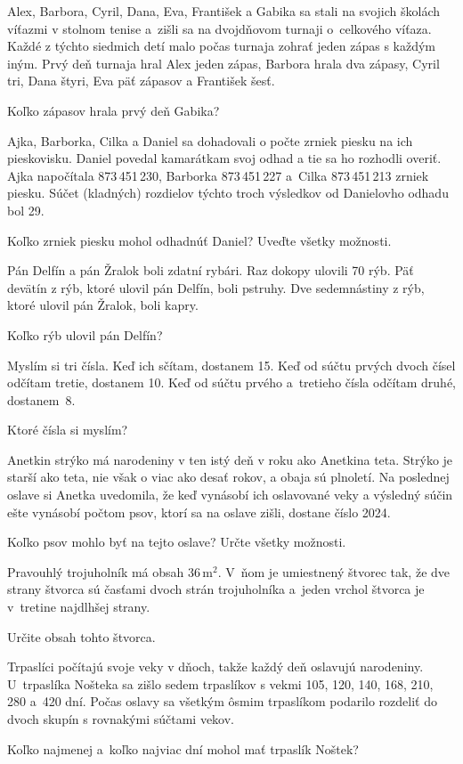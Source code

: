 {%
Alex, Barbora, Cyril, Dana, Eva, František a Gabika sa stali na svojich školách víťazmi v stolnom tenise
a~zišli sa na dvojdňovom turnaji o~celkového víťaza.
Každé z týchto siedmich detí malo počas turnaja zohrať jeden zápas s každým iným.
Prvý deň turnaja hral Alex jeden zápas, Barbora hrala dva zápasy, Cyril tri, Dana štyri, Eva päť zápasov a František šesť.

Koľko zápasov hrala prvý deň Gabika?
}

{%
Ajka, Barborka, Cilka a Daniel sa dohadovali o počte zrniek piesku na ich pieskovisku.
Daniel povedal kamarátkam svoj odhad a tie sa ho rozhodli overiť.
Ajka napočítala 873\,451\,230, Barborka 873\,451\,227 a~Cilka 873\,451\,213 zrniek piesku.
Súčet (kladných) rozdielov týchto troch výsledkov od Danielovho odhadu bol 29.

Koľko zrniek piesku mohol odhadnúť Daniel?
Uveďte všetky možnosti.
}

{%


Pán Delfín a pán Žralok boli zdatní rybári.
Raz dokopy ulovili 70 rýb.
Päť devätín z rýb, ktoré ulovil pán Delfín, boli pstruhy.
Dve sedemnástiny z rýb, ktoré ulovil pán Žralok, boli kapry.

Koľko rýb ulovil pán Delfín?
}

{%
Myslím si tri čísla.
Keď ich sčítam, dostanem 15.
Keď od súčtu prvých dvoch čísel odčítam tretie, dostanem 10.
Keď od súčtu prvého a~tretieho čísla odčítam druhé, dostanem~8.

Ktoré čísla si myslím?
}

{%
Anetkin strýko má narodeniny v ten istý deň v roku ako Anetkina teta.
Strýko je starší ako teta, nie však o viac ako desať rokov, a obaja sú plnoletí.
Na poslednej oslave si Anetka uvedomila, že keď vynásobí ich oslavované veky a výsledný súčin ešte vynásobí počtom psov, ktorí sa na oslave zišli, dostane číslo 2024.

Koľko psov mohlo byť na tejto oslave?
Určte všetky možnosti.
}

{%
Pravouhlý trojuholník má obsah 36\,m$^2$.
V~ňom je umiestnený štvorec tak, že dve strany štvorca sú časťami dvoch strán trojuholníka a~jeden vrchol štvorca je v~tretine najdlhšej strany.

Určite obsah tohto štvorca.
}

{%
Trpaslíci počítajú svoje veky v dňoch, takže každý deň oslavujú narodeniny.
U~trpaslíka Nošteka sa zišlo sedem trpaslíkov s vekmi 105, 120, 140, 168, 210, 280 a~420 dní.
Počas oslavy sa všetkým ôsmim trpaslíkom podarilo rozdeliť do dvoch skupín s rovnakými súčtami vekov.

Koľko najmenej a~koľko najviac dní mohol mať trpaslík Noštek?
}

